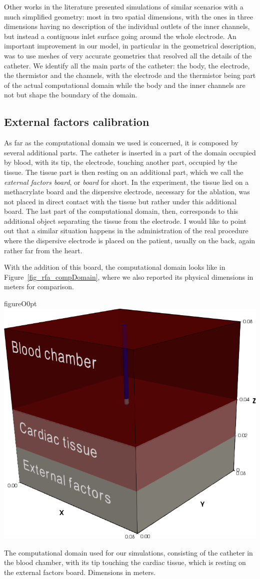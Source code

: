 Other works in the literature presented simulations of similar scenarios with a much simplified geometry: most in two spatial dimensions, with the ones in three dimensions having no description of the individual outlets of the inner channels, but instead a contiguous inlet surface going around the whole electrode.
An important improvement in our model, in particular in the geometrical description, was to use meshes of very accurate geometries that resolved all the details of the catheter.
We identify all the main parts of the catheter: the body, the electrode, the thermistor and the channels, with the electrode and the thermistor being part of the actual computational domain while the body and the inner channels are not but shape the boundary of the domain.

\subsection{External factors calibration}
\label{sub_rfaExternalFactors}
As far as the computational domain we used is concerned, it is composed by several additional parts.
The catheter is inserted in a part of the domain occupied by blood, with its tip, the electrode, touching another part, occupied by the tissue.
The tissue part is then resting on an additional part, which we call the \emph{external factors board}, or \emph{board} for short.
In the experiment, the tissue lied on a methacrylate board and the dispersive electrode, necessary for the ablation, was not placed in direct contact with the tissue but rather under this additional board.
The last part of the computational domain, then, corresponds to this additional object separating the tissue from the electrode.
I would like to point out that a similar situation happens in the administration of the real procedure where the dispersive electrode is placed on the patient, usually on the back, again rather far from the heart.

With the addition of this board, the computational domain looks like in Figure~\ref{fig_rfa_compDomain}, where we also reported its physical dimensions in meters for comparison.
\begin{wrapfloat}{figure}{O}{0pt}
  \centering
    \includegraphics[width=0.5\columnwidth]{img/rfa/compDomain}
    \caption{The computational domain used for our simulations, consisting of the catheter in the blood chamber, with its tip touching the cardiac tissue, which is resting on the external factors board. Dimensions in meters.}
    \label{fig_rfa_compDomain}
\end{wrapfloat}

